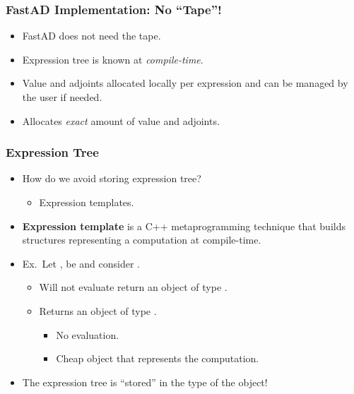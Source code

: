 \begin{frame}
\frametitle{FastAD Implementation: No ``Tape''!}

\begin{itemize}
    
\item FastAD does not need the tape.

\item Expression tree is known at \emph{compile-time}.

\item Value and adjoints allocated locally per expression
    and can be managed by the user if needed.

\item Allocates \emph{exact} amount of value and adjoints.

\end{itemize}
\end{frame}

\begin{frame}
\frametitle{Expression Tree}
\begin{itemize}

\item How do we avoid storing expression tree?
    \begin{itemize}
        \item Expression templates.
    \end{itemize}

\item \textbf{Expression template} is a C++ metaprogramming technique
    that builds structures representing a computation at compile-time.

\item Ex.\ Let ,  be 
    and consider .
    \begin{itemize}
        \item Will not evaluate return an object of type .
        \item Returns an object of type .
            \begin{itemize}
                \item No evaluation.
                \item Cheap object that represents the computation.
            \end{itemize}
    \end{itemize}

\item The expression tree is ``stored'' in the type of the object!

\end{itemize}
\end{frame}

